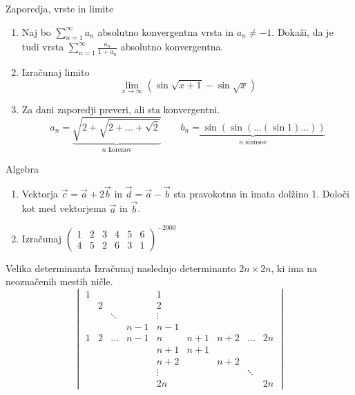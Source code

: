 \begin{frame}{Zaporedja, vrste in limite}
	\begin{enumerate}
		\item 
		Naj bo $\sum_{n=1}^{\infty} a_n$ absolutno konvergentna vrsta in $a_n \ne -1$.
		Dokaži, da je tudi vrsta $\sum_{n=1}^\infty \frac{a_n}{1+a_n}$
		absolutno konvergentna.

		\item
		Izračunaj limito
		\[\lim_{x\to\infty}(\sin\sqrt{x+1}-\sin\sqrt{x})\]

		\item
		Za dani zaporedji preveri, ali sta konvergentni.
		\[a_n = \underbrace{\sqrt{2+\sqrt{2+\dots+\sqrt{2}}}}_{n\text{ korenov}} \qquad 
		\underbrace{b_n = \sin(\sin(\dots(\sin 1)\dots))}_{n\text{ sinusov}}\]
	\end{enumerate}
\end{frame}

\begin{frame}{Algebra}
	\begin{enumerate}
		\item
		Vektorja $\vec{c}=\vec{a}+2\vec{b}$ in $\vec{d}=\vec{a}-\vec{b}$
		sta pravokotna in imata dolžino 1. Določi kot med vektorjema $\vec{a}$ in $\vec{b}$.
		\item 
		Izračunaj
		$\begin{pmatrix}
			1&2&3&4&5&6\\
			4&5&2&6&3&1
		\end{pmatrix}^{-2000}$
	\end{enumerate}
\end{frame}

\begin{frame}{Velika determinanta}
	Izračunaj naslednjo determinanto $2n \times 2n$, ki ima na neoznačenih mestih ničle.
	\[
		\begin{vmatrix}
			1&&&&1&&&&\\
			&2&&&2&&&&\\
			&&\ddots&&\vdots&&&&\\
			&&&n-1&n-1&&&&\\
			1&2&\dots&n-1&n&n+1&n+2&\dots&2n\\
			&&&&n+1&n+1&&&\\
			&&&&n+2&&n+2&&\\
			&&&&\vdots&&&\ddots&\\
			&&&&2n&&&&2n
		\end{vmatrix}
	\]
\end{frame}

